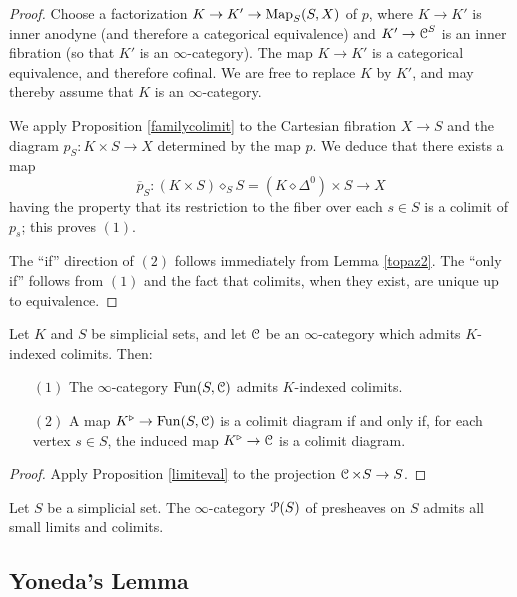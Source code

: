 \begin{proof}
Choose a factorization $K \rightarrow K' \rightarrow \operatorname{{Map}}_{S}(S,X)$ of $p$,
where $K \rightarrow K'$ is inner anodyne (and therefore a
categorical equivalence) and $K' \rightarrow \operatorname{\mathcal{C}}^S$ is an inner fibration (so that $K'$ is an $\infty$-category). The map $K \rightarrow K'$ is a categorical equivalence, and therefore cofinal. We are free to replace $K$ by $K'$, and may thereby assume 
that $K$ is an $\infty$-category.

We apply Proposition \ref{familycolimit} to the Cartesian
fibration $X \rightarrow S$ and the diagram $p_S: K
\times S \rightarrow X$ determined by the map $p$. We
deduce that there exists a map $$\overline{p}_S: (K \times S) \diamond_S S = (K
\diamond \Delta^0) \times S \rightarrow X$$ having the property that
its restriction to the fiber over each $s \in S$ is a colimit of
$p_s$; this proves $(1)$.

The ``if'' direction of $(2)$ follows immediately from Lemma \ref{topaz2}. The ``only if'' follows
from $(1)$ and the fact that colimits, when they exist, are unique up to equivalence.
\end{proof}

\begin{corollary}
Let $K$ and $S$ be simplicial sets, and let $\operatorname{\mathcal{C}}$ be an $\infty$-category which admits $K$-indexed colimits. Then:
\begin{itemize}
\item[$(1)$] The $\infty$-category $\operatorname{Fun}(S, \operatorname{\mathcal{C}})$ admits $K$-indexed colimits.
\item[$(2)$] A map $K^{\triangleright} \rightarrow \operatorname{Fun}(S,\operatorname{\mathcal{C}})$ is a colimit diagram if and only if,
for each vertex $s \in S$, the induced map $K^{\triangleright} \rightarrow \operatorname{\mathcal{C}}$ is a colimit diagram.
\end{itemize}
\end{corollary}

\begin{proof}
Apply Proposition \ref{limiteval} to the projection $\operatorname{\mathcal{C}} \times S \rightarrow S$.
\end{proof}

\begin{corollary}\label{storum}
Let $S$ be a simplicial set. The $\infty$-category $\operatorname{\mathcal{P}}(S)$ of presheaves on $S$ admits all small limits and colimits.
\end{corollary}

\subsection{Yoneda's Lemma}\label{presheaf1}

